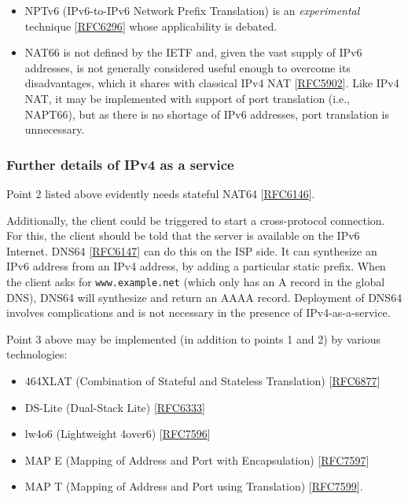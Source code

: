 \documentclass[
]{article}
\providecommand{\tightlist}{%
  \setlength{\itemsep}{0pt}\setlength{\parskip}{0pt}}
\begin{document}
\begin{itemize}
  \begin{itemize}
  \item
    NPTv6 (IPv6-to-IPv6 Network Prefix Translation) is an
    \emph{experimental} technique
    {[}\href{https://www.rfc-editor.org/info/rfc6296}{RFC6296}{]} whose
    applicability is debated.
  \item
    NAT66 is not defined by the IETF and, given the vast supply of IPv6
    addresses, is not generally considered useful enough to overcome its
    disadvantages, which it shares with classical IPv4 NAT
    {[}\href{https://www.rfc-editor.org/info/rfc5902}{RFC5902}{]}. Like
    IPv4 NAT, it may be implemented with support of port translation
    (i.e., NAPT66), but as there is no shortage of IPv6 addresses, port
    translation is unnecessary.
  \end{itemize}
\end{itemize}

\subsubsection{Further details of IPv4 as a
service}\label{further-details-of-ipv4-as-a-service}

Point 2 listed above evidently needs stateful NAT64
{[}\href{https://www.rfc-editor.org/info/rfc6146}{RFC6146}{]}.

Additionally, the client could be triggered to start a cross-protocol
connection. For this, the client should be told that the server is
available on the IPv6 Internet. DNS64
{[}\href{https://www.rfc-editor.org/info/rfc6147}{RFC6147}{]} can do
this on the ISP side. It can synthesize an IPv6 address from an IPv4
address, by adding a particular static prefix. When the client asks for
\texttt{www.example.net} (which only has an A record in the global DNS),
DNS64 will synthesize and return an AAAA record. Deployment of DNS64
involves complications and is not necessary in the presence of
IPv4-as-a-service.

Point 3 above may be implemented (in addition to points 1 and 2) by
various technologies:

\begin{itemize}
\tightlist
\item
  464XLAT (Combination of Stateful and Stateless Translation)
  {[}\href{https://www.rfc-editor.org/info/rfc6877}{RFC6877}{]}
\item
  DS-Lite (Dual-Stack Lite)
  {[}\href{https://www.rfc-editor.org/info/rfc6333}{RFC6333}{]}
\item
  lw4o6 (Lightweight 4over6)
  {[}\href{https://www.rfc-editor.org/info/rfc7596}{RFC7596}{]}
\item
  MAP E (Mapping of Address and Port with Encapsulation)
  {[}\href{https://www.rfc-editor.org/info/rfc7597}{RFC7597}{]}
\item
  MAP T (Mapping of Address and Port using Translation)
  {[}\href{https://www.rfc-editor.org/info/rfc7599}{RFC7599}{]}.
\end{itemize}
\end{document}
